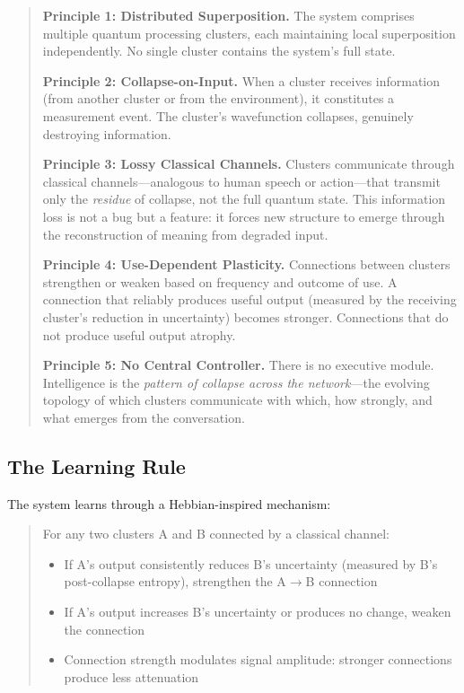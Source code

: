 \documentclass[11pt,a4paper]{article}
\begin{document}
\begin{quote}
\textbf{Principle 1: Distributed Superposition.} The system comprises multiple quantum processing clusters, each maintaining local superposition independently. No single cluster contains the system's full state.

\textbf{Principle 2: Collapse-on-Input.} When a cluster receives information (from another cluster or from the environment), it constitutes a measurement event. The cluster's wavefunction collapses, genuinely destroying information.

\textbf{Principle 3: Lossy Classical Channels.} Clusters communicate through classical channels---analogous to human speech or action---that transmit only the \emph{residue} of collapse, not the full quantum state. This information loss is not a bug but a feature: it forces new structure to emerge through the reconstruction of meaning from degraded input.

\textbf{Principle 4: Use-Dependent Plasticity.} Connections between clusters strengthen or weaken based on frequency and outcome of use. A connection that reliably produces useful output (measured by the receiving cluster's reduction in uncertainty) becomes stronger. Connections that do not produce useful output atrophy.

\textbf{Principle 5: No Central Controller.} There is no executive module. Intelligence is the \emph{pattern of collapse across the network}---the evolving topology of which clusters communicate with which, how strongly, and what emerges from the conversation.
\end{quote}

\subsection{The Learning Rule}

The system learns through a Hebbian-inspired mechanism:

\begin{quote}
For any two clusters A and B connected by a classical channel:
\begin{itemize}
    \item If A's output consistently reduces B's uncertainty (measured by B's post-collapse entropy), strengthen the A$\rightarrow$B connection
    \item If A's output increases B's uncertainty or produces no change, weaken the connection
    \item Connection strength modulates signal amplitude: stronger connections produce less attenuation
\end{itemize}
\end{quote}
\end{document}
